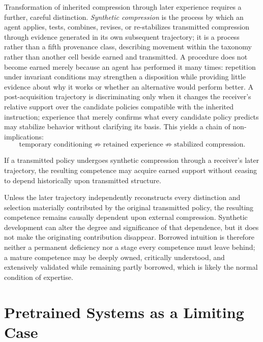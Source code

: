 Transformation of inherited compression through later experience requires a further, careful distinction. \emph{Synthetic compression} is the process by which an agent applies, tests, combines, revises, or re-stabilizes transmitted compression through evidence generated in its own subsequent trajectory; it is a process rather than a fifth provenance class, describing movement within the taxonomy rather than another cell beside earned and transmitted. A procedure does not become earned merely because an agent has performed it many times: repetition under invariant conditions may strengthen a disposition while providing little evidence about why it works or whether an alternative would perform better. A post-acquisition trajectory is discriminating only when it changes the receiver's relative support over the candidate policies compatible with the inherited instruction; experience that merely confirms what every candidate policy predicts may stabilize behavior without clarifying its basis. This yields a chain of non-implications:
\[
\text{temporary conditioning} \not\Rightarrow \text{retained experience} \not\Rightarrow \text{stabilized compression}.
\]

\begin{proposition}
If a transmitted policy undergoes synthetic compression through a receiver's later trajectory, the resulting competence may acquire earned support without ceasing to depend historically upon transmitted structure.
\end{proposition}

Unless the later trajectory independently reconstructs every distinction and selection materially contributed by the original transmitted policy, the resulting competence remains causally dependent upon external compression. Synthetic development can alter the degree and significance of that dependence, but it does not make the originating contribution disappear. Borrowed intuition is therefore neither a permanent deficiency nor a stage every competence must leave behind; a mature competence may be deeply owned, critically understood, and extensively validated while remaining partly borrowed, which is likely the normal condition of expertise.

\section{Pretrained Systems as a Limiting Case}

